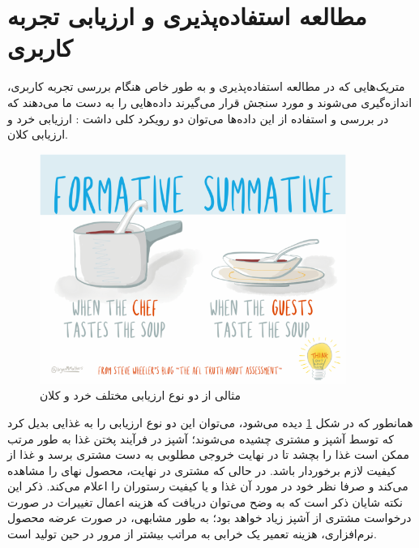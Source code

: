 \section{مطالعه استفاده‌پذیری و ارزیابی تجربه کاربری}
متریک‌هایی که در مطالعه استفاده‌پذیری و به طور خاص هنگام بررسی تجربه کاربری، اندازه‌گیری می‌شوند و مورد سنجش قرار می‌گیرند داده‌هایی را به دست ما می‌دهند که در بررسی و استفاده از این داده‌ها می‌توان دو رویکرد کلی داشت
\cite{albert_measuring_2013}:
ارزیابی خرد و ارزیابی کلان.\\
\begin{figure}
	\centering\includegraphics[width=10cm]{Resources/assessment.PNG}
	\caption{مثالی از دو نوع ارزیابی مختلف خرد و کلان
		\cite{noauthor_formative_nodate}
	}
	\label{fig:assessment}
\end{figure}
همانطور که در شکل
\ref{fig:assessment}
دیده می‌شود، می‌توان این دو نوع ارزیابی را به غذایی بدیل کرد که توسط آشپز و مشتری چشیده می‌شوند؛ آشپز در فرآیند پختن غذا به طور مرتب ممکن است غذا را بچشد تا در نهایت خروجی مطلوبی به دست مشتری برسد و غذا از کیفیت لازم برخوردار باشد. در حالی که مشتری در نهایت، محصول نهای را مشاهده می‌کند و صرفا نظر خود در مورد آن غذا و یا کیفیت رستوران را اعلام می‌کند. ذکر این نکته شایان ذکر است که به وضح می‌توان دریافت که هزینه اعمال تغییرات در صورت درخواست مشتری از آشپز زیاد خواهد بود؛ به طور مشابهی، در صورت عرضه محصول نرم‌افزاری، هزینه تعمیر یک خرابی به مراتب بیشتر از مرور در حین تولید است.

